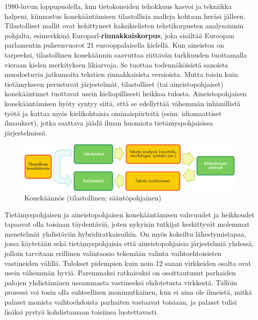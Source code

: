 \begin{multicols}{2}
1980-luvun loppupuolella, kun tietokoneiden tehokkuus kasvoi ja
tekniikka halpeni, kiinnostus konekääntämisen tilastollisia malleja
kohtaan heräsi jälleen. Tilastolliset mallit ovat kehittyneet
kaksikielisten tekstikorpusten analysoinnin pohjalta, esimerkkinä
Europarl-\textbf{rinnakkaiskorpus}, joka sisältää Euroopan parlamentin
puheenvuorot 21 eurooppalaisella kielellä. Kun aineistoa on tarpeeksi,
tilastollinen konekäännin saavuttaa riittävän tarkkuuden tuottamalla
vieraan kielen merkityksen likiarvoja. Se tuottaa todennäköisistä
sanoista muodostuvia jatkumoita tekstien rinnakkaisista
versioista. Mutta toisin kuin tietämykseen perustuvat järjestelmät,
tilastolliset (tai aineistopohjaiset) konekääntimet tuottavat usein
kieliopillisesti heikkoa tulosta.  Aineistopohjaisen konekääntämisen
hyöty syntyy siitä, että se edellyttää vähemmän inhimillistä työtä ja
kattaa myös kielikohtaisia ominaispiirteitä (esim. idiomaattiset
ilmaukset), jotka saattava jäädä ilman huomiota tietämyspohjaisissa
järjestelmissä.

\begin{figure}[htb]
  \center
  \includegraphics[width=\textwidth]{../_media/finnish/machine_translation}
  \caption{Konekäännös (tilastollinen; sääntöpohjainen)}
  \label{fig:mtarch-fin}
\end{figure}

Tietämyspohjaisen ja aineistopohjaisen konekääntämisen vahvuudet ja
heikkoudet tapaavat olla toisiaan täydentäviä, joten nykyisin tutkijat
keskittyvät molemmat menetelmät yhdistäviin hybridiratkaisuihin. 
On myös kokeiltu lähestymistapaa, jossa käytetään sekä tietämyspohjaisia että
aineistopohjaisia järjestelmiä yhdessä, jolloin tarvitaan erillinen valintaosio 
tekemään valinta vaihtoehtoisisten vastineiden välillä.  Tulokset pidempien kuin noin 12 sanan 
virkkeiden osalta ovat usein vähemmän hyviä. Paremmaksi ratkaisuksi on osoittautunut 
parhaiden palojen yhdistäminen useammasta vastineeksi ehdotetusta virkkestä. 
Tällöin prosessi voi tosin olla suhteellisen monimutkainen, kun
ei aina ole ilmeistä, mitkä palaset monista vaihtoehdoista parhaiten vastaavat
toisiaan, ja palaset tulisi lisäksi pystyä kohdistamaan toisiinsa
luotettavasti.


\end{multicols}
